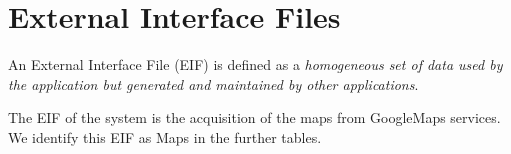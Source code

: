 \section{External Interface Files}
An External Interface File (EIF) is defined as a \emph{homogeneous set of data used by the application but generated and maintained by other applications}.

The EIF of the system is the acquisition of the maps from GoogleMaps services. We identify this EIF as Maps in the further tables.